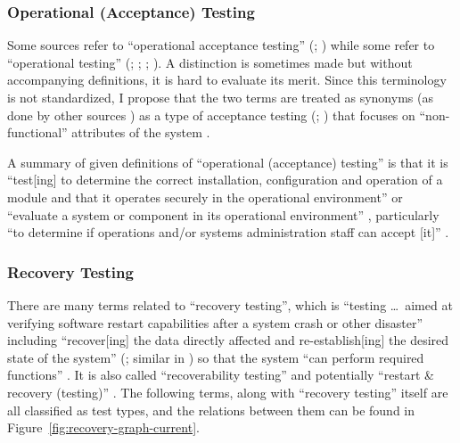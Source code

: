 \subsubsection{Operational (Acceptance) Testing}
Some sources refer to ``operational acceptance testing'' (\citealp[p.~22]{IEEE2022};
\citealpISTQB{}) while some refer to ``operational testing''
(\citealp[p.~6-9,~in the context of software engineering operations]{SWEBOK2024};
\citealp{ISO_IEC2018}; \citealp[p.~303]{IEEE2017};
\citealp[pp.~4-6,~4-9]{SWEBOK2014}). A distinction is sometimes made
\citep[p.~30]{Firesmith2015} but without accompanying definitions, it is hard
to evaluate its merit. Since this terminology is not standardized, I
propose that the two terms are treated as synonyms (as done by other sources
\citep{LambdaTest2024, BocchinoAndHamilton1996}) as a type of
acceptance testing (\citealp[p.~22]{IEEE2022}; \citealpISTQB{}) that focuses on
``non-functional'' attributes of the system \citep{LambdaTest2024}
.

A summary of given definitions of ``operational (acceptance) testing'' is that
it is ``test[ing] to determine the correct
installation, configuration and operation of a module and that it operates
securely in the operational environment'' \citep{ISO_IEC2018} or ``evaluate a
system or component in its operational environment'' \citep[p.~303]{IEEE2017},
particularly ``to determine if operations and/or systems administration staff
can accept [it]'' \citepISTQB{}.

\subsubsection{Recovery Testing}
\label{rec-test-ambiguity}

There are many terms related to ``recovery testing'', which is ``testing
\dots\ aimed at verifying
software restart capabilities after a system crash or other disaster''
\citep[p.~5-9]{SWEBOK2024} including ``recover[ing] the data directly affected
and re-establish[ing] the desired state of the system'' (\citealp{ISO_IEC2023a};
similar in \citealp[p.~7-10]{SWEBOK2024}) so
that the system ``can perform required functions'' \citep[p.~370]{IEEE2017}.
It is also called ``recoverability testing'' \cite[p.~47]{Kam2008} and
potentially ``restart \& recovery (testing)'' \cite[Fig.~5]{Gerrard2000a}. The
following terms, along with ``recovery testing'' itself \citep[p.~22]{IEEE2022}
are all classified as test types, and the relations between them can be found
in Figure~\ref{fig:recovery-graph-current}.

